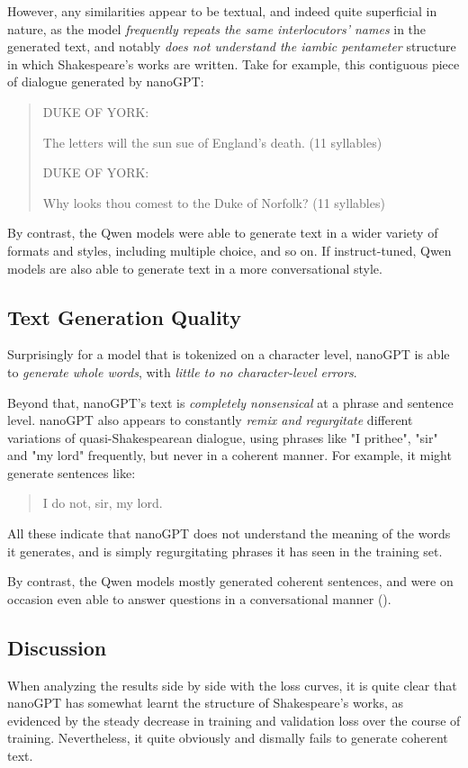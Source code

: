 \documentclass{article} %
\theoremstyle{definition}
\begin{document}
However, any similarities appear to be textual, and indeed quite superficial in nature,
as the model \textit{frequently repeats the same interlocutors' names} in the generated text,
and notably \textit{does not understand the iambic pentameter} structure in which Shakespeare's 
works are written. Take for example, this contiguous piece of dialogue generated by nanoGPT:
\begin{quote}
DUKE OF YORK:

The letters will the sun sue of England's death. (11 syllables)

DUKE OF YORK:

Why looks thou comest to the Duke of Norfolk? (11 syllables)
\end{quote}


By contrast, the Qwen models were able to generate text in a wider variety of formats
and styles, including multiple choice, and so on. If instruct-tuned, Qwen models
are also able to generate text in a more conversational style.

\subsection{Text Generation Quality}
Surprisingly for a model that is tokenized on a character level,
nanoGPT is able to \textit{generate whole words}, with \textit{little to no character-level errors}.

Beyond that, nanoGPT's text is \textit{completely nonsensical} at a phrase and sentence level.
nanoGPT also appears to constantly \textit{remix and regurgitate} different variations
of quasi-Shakespearean dialogue, using phrases like "I prithee", "sir" and "my lord" frequently,
but never in a coherent manner. For example, it might generate sentences like:
\begin{quote}
    I do not, sir, my lord. 
\end{quote}

All these indicate that nanoGPT does not understand the meaning of the words it generates,
and is simply regurgitating phrases it has seen in the training set.

By contrast, the Qwen models mostly generated coherent sentences,
and were on occasion even able to answer questions in a conversational manner (\cite{beh-2025-b}).

\subsection{Discussion}
When analyzing the results side by side with the loss curves,
it is quite clear that nanoGPT has somewhat learnt the structure of Shakespeare's works,
as evidenced by the steady decrease in training and validation loss
over the course of training. Nevertheless, it quite obviously and dismally fails 
to generate coherent text.
\end{document}
